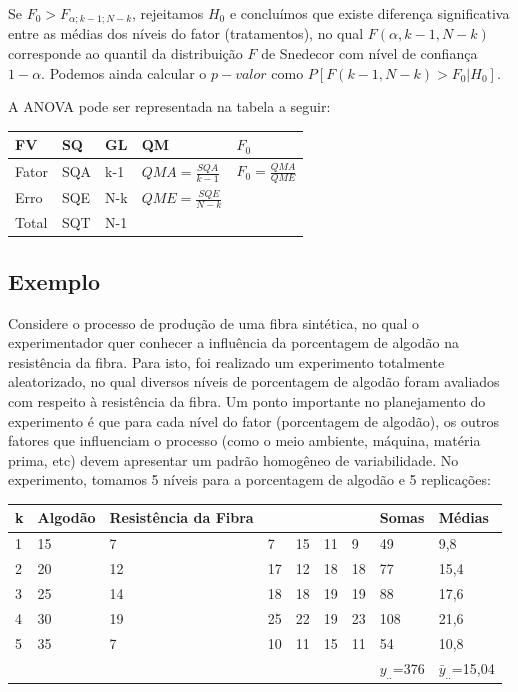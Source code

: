 \documentclass[
]{book}
\begin{document}
Se \(F_0>F_{\alpha;k-1;N-k}\), rejeitamos \(H_0\) e concluímos que existe diferença significativa entre as médias dos níveis do fator (tratamentos), no qual \(F(\alpha,k-1,N-k)\) corresponde ao quantil da distribuição \(F\) de Snedecor com nível de confiança \(1-\alpha\). Podemos ainda calcular o \(p-valor\) como \(P[F(k-1,N-k)>F_0 | H_0]\).

A ANOVA pode ser representada na tabela a seguir:

\begin{longtable}[]{@{}lllll@{}}
\toprule
FV & SQ & GL & QM & \(F_0\) \\
\midrule
\endhead
Fator & SQA & k-1 & \(QMA=\frac{SQA}{k-1}\) & \(F_0=\frac{QMA}{QME}\) \\
Erro & SQE & N-k & \(QME=\frac{SQE}{N-k}\) & \\
Total & SQT & N-1 & & \\
\bottomrule
\end{longtable}

\hypertarget{exemplo-19}{%
\subsection{Exemplo}\label{exemplo-19}}

Considere o processo de produção de uma fibra sintética, no qual o experimentador quer conhecer a influência da porcentagem de algodão na resistência da fibra. Para isto, foi realizado um experimento totalmente aleatorizado, no qual diversos níveis de porcentagem de algodão foram avaliados com respeito à resistência da fibra. Um ponto importante no planejamento do experimento é que para cada nível do fator (porcentagem de algodão), os outros fatores que influenciam o processo (como o meio ambiente, máquina, matéria prima, etc) devem apresentar um padrão homogêneo de variabilidade. No experimento, tomamos 5 níveis para a porcentagem de algodão e 5 replicações:

\begin{longtable}[]{@{}lllllllll@{}}
\toprule
k & Algodão & Resistência da Fibra & & & & & Somas & Médias \\
\midrule
\endhead
1 & 15 & 7 & 7 & 15 & 11 & 9 & 49 & 9,8 \\
2 & 20 & 12 & 17 & 12 & 18 & 18 & 77 & 15,4 \\
3 & 25 & 14 & 18 & 18 & 19 & 19 & 88 & 17,6 \\
4 & 30 & 19 & 25 & 22 & 19 & 23 & 108 & 21,6 \\
5 & 35 & 7 & 10 & 11 & 15 & 11 & 54 & 10,8 \\
& & & & & & & \(y_{..}\)=376 & \(\bar y_{..}\)=15,04 \\
\bottomrule
\end{longtable}
\end{document}

